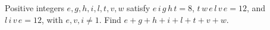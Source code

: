 Positive integers $e,g,h,i,l,t,v,w$ satisfy $e\,i\,g\,h\,t=8$, $t\,w\,e\,l\,v\,e=12$, and $l\,i\,v\,e=12$, with $e,v,i\ne1$. Find $e+g+h+i+l+t+v+w$.
